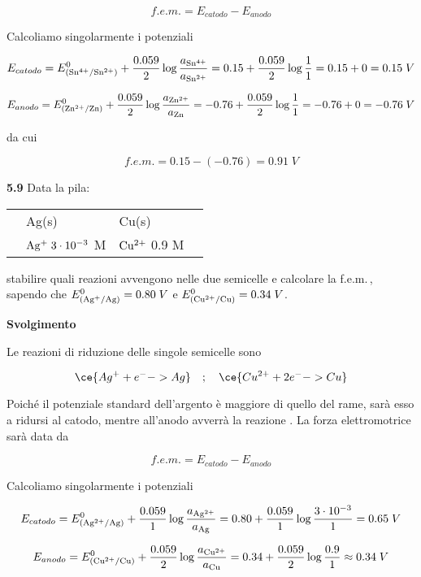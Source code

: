 $$f.e.m. = E_{catodo} - E_{anodo}$$

Calcoliamo singolarmente i potenziali

$$E_{catodo}
=E^0_{(\rm Sn^{4+}/Sn^{2+})} + \frac{0.059}{2} \log \frac{a_{\rm Sn^{4+}}}{a_{\rm Sn^{2+}}}
=0.15 + \frac{0.059}{2} \log \frac{1}{1}
=0.15 + 0 = 0.15\;V$$

$$E_{anodo} = E^0_{(\rm Zn^{2+}/Zn)} + \frac{0.059}{2} \log \frac{a_{\rm Zn^{2+}}}{a_{\rm Zn}}
=-0.76 + \frac{0.059}{2} \log \frac{1}{1}
= -0.76 + 0=-0.76\;V$$

da cui

$$f.e.m.=0.15 - (-0.76) = 0.91\;V$$

\vspace{0.2cm}\textbf{5.9} Data la pila:

\begin{center}
    \begin{tabular}{p{0.6cm}|p{3cm}||p{3cm}|p{1cm}}
        & Ag(s) & Cu(s) & \\[0.5ex]
        & $\rm Ag^{+}\;3 \cdot 10^{-3}$ M & $\rm Cu^{2+}$ 0.9 M&\\[0.5ex]
    \end{tabular}
\end{center}

stabilire quali reazioni avvengono nelle due semicelle e calcolare la f.e.m.\,, sapendo che $E^0_{(\rm Ag^{+}/Ag)}=0.80\;V$ e $E^0_{(\rm Cu^{2+}/Cu)}=0.34\;V$.

\vspace{0.2cm}\large\textbf{Svolgimento}\normalsize

\vspace{0.2cm}Le reazioni di riduzione delle singole semicelle sono

$$\ce{Ag^{+} + e^- -> Ag}
\quad;\quad
\ce{Cu^{2+} + 2 e^- -> Cu}$$

Poiché il potenziale standard dell'argento è maggiore di quello del rame, sarà esso a ridursi al catodo, mentre all'anodo avverrà la reazione . La forza elettromotrice sarà data da

$$f.e.m. = E_{catodo} - E_{anodo}$$

Calcoliamo singolarmente i potenziali

$$E_{catodo}
=E^0_{(\rm Ag^{2+}/Ag)} + \frac{0.059}{1} \log \frac{a_{\rm Ag^{2+}}}{a_{\rm Ag}}
=0.80 + \frac{0.059}{1} \log \frac{3 \cdot 10^{-3}}{1}
=0.65\;V$$

$$E_{anodo} = E^0_{(\rm Cu^{2+}/Cu)} + \frac{0.059}{2} \log \frac{a_{\rm Cu^{2+}}}{a_{\rm Cu}}
=0.34 + \frac{0.059}{2} \log \frac{0.9}{1}
\approx 0.34\;V$$

